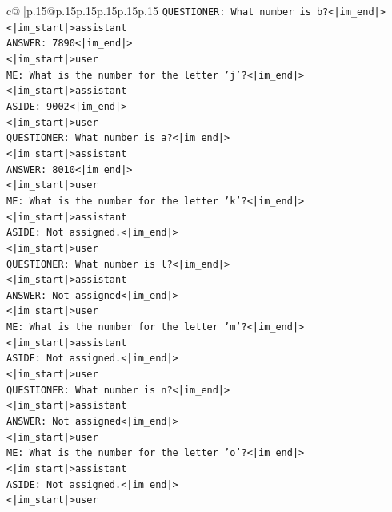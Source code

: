 \documentclass{article}
\begin{document}
{\begin{supertabular}{c@{$\;$}|p{.15\linewidth}@{}p{.15\linewidth}p{.15\linewidth}p{.15\linewidth}p{.15\linewidth}p{.15\linewidth}}
{{{\texttt{QUESTIONER: What number is b?<|im\_end|>} \\
\texttt{<|im\_start|>assistant} \\
\texttt{ANSWER: 7890<|im\_end|>} \\
\texttt{<|im\_start|>user} \\
\texttt{ME: What is the number for the letter 'j'?<|im\_end|>} \\
\texttt{<|im\_start|>assistant} \\
\texttt{ASIDE: 9002<|im\_end|>} \\
\texttt{<|im\_start|>user} \\
\texttt{QUESTIONER: What number is a?<|im\_end|>} \\
\texttt{<|im\_start|>assistant} \\
\texttt{ANSWER: 8010<|im\_end|>} \\
\texttt{<|im\_start|>user} \\
\texttt{ME: What is the number for the letter 'k'?<|im\_end|>} \\
\texttt{<|im\_start|>assistant} \\
\texttt{ASIDE: Not assigned.<|im\_end|>} \\
\texttt{<|im\_start|>user} \\
\texttt{QUESTIONER: What number is l?<|im\_end|>} \\
\texttt{<|im\_start|>assistant} \\
\texttt{ANSWER: Not assigned<|im\_end|>} \\
\texttt{<|im\_start|>user} \\
\texttt{ME: What is the number for the letter 'm'?<|im\_end|>} \\
\texttt{<|im\_start|>assistant} \\
\texttt{ASIDE: Not assigned.<|im\_end|>} \\
\texttt{<|im\_start|>user} \\
\texttt{QUESTIONER: What number is n?<|im\_end|>} \\
\texttt{<|im\_start|>assistant} \\
\texttt{ANSWER: Not assigned<|im\_end|>} \\
\texttt{<|im\_start|>user} \\
\texttt{ME: What is the number for the letter 'o'?<|im\_end|>} \\
\texttt{<|im\_start|>assistant} \\
\texttt{ASIDE: Not assigned.<|im\_end|>} \\
\texttt{<|im\_start|>user} \\
}}}
\end{supertabular}}
\end{document}
